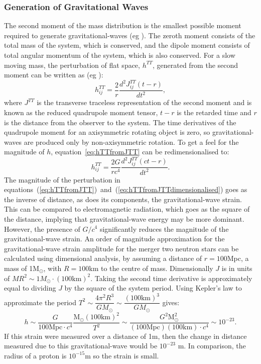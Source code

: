 \subsubsection{Generation of Gravitational Waves}
\label{sec:GWgeneration}
The second moment of the mass distribution is the
smallest possible moment required to generate gravitational-waves (eg \cite{Flanagan2005}). The zeroth moment consists of the total mass of the system, which is conserved, and the dipole moment consists of total angular momentum of the system, which is also conserved. For a slow moving mass, the perturbation of flat space, $h^{TT}$, generated from the second moment can be written as (eg \cite{CarrollSpacetimeGeometry}):
\begin{equation}
h^{TT}_{ij} = \dfrac{2}{r}\dfrac{d^2J^{TT}_{ij}\left(t-r\right)}{dt^2},
\label{eq:hTTfromJTT}
\end{equation}
where $J^{TT}$ is the transverse traceless representation of the second moment and is known as the reduced quadrupole moment tensor, $t-r$ is the retarded time and $r$ is the distance from the observer to the system. The time derivatives of the quadrupole moment for an axisymmetric rotating object is zero, so gravitational-waves are produced only by non-axisymmetric rotation. To get a feel for the magnitude of $h$, equation~\ref{eq:hTTfromJTT} can be redimensionalised to:
\begin{equation}
h^{TT}_{ij} = \dfrac{2G}{rc^4}\dfrac{d^2J^{TT}_{ij}\left(ct-r\right)}{dt^2}.
\label{eq:hTTfromJTTdimensionalised}
\end{equation}
The magnitude of the perturbation in equations~(\ref{eq:hTTfromJTT})~and~(\ref{eq:hTTfromJTTdimensionalised}) goes as the inverse of distance, as does its components, the gravitational-wave strain. This can be compared to electromagnetic radiation, which goes as the square of the distance, implying that gravitational-wave energy may be more dominant. However, the presence of $G/c^4$ significantly reduces the magnitude of the gravitational-wave strain. An order of magnitude approximation for the gravitational-wave strain amplitude for the merger two neutron stars can be calculated using dimensional analysis, by assuming a distance of $r=100$Mpc, a mass of 1M$_\odot$, with $R=100$km to the centre of mass. Dimensionally $J$ is in units of $M R^2 \sim 1M_\odot\cdot (100\mathrm{km})^2$. Taking the second time derivative is approximately equal to dividing $J$ by the square of the system period. Using Kepler's law to approximate the period $T^2\sim\dfrac{4\pi^2R^3}{G M_\odot}\sim \dfrac{(100\mathrm{ km})^3}{G M_\odot}$ gives:
\begin{equation}
h\sim \dfrac{G}{100 \mathrm{Mpc}  \cdot c^4}  \dfrac{\mathrm{M}_\odot (100 \mathrm{km})^2}{T^2}\sim\dfrac{G^2 \mathrm{M}_\odot^2}{(100 \mathrm{Mpc})(100 \mathrm{km})  \cdot c^4}\sim 10^{-23}.
\label{eq:hballpark}
\end{equation}
If this strain were measured over a distance of 1m, then the change in distance measured due to this gravitational-wave would be $10^{-23}$ m. In comparison, the radius of a proton is $10^{-15}$m so the strain is small. 
